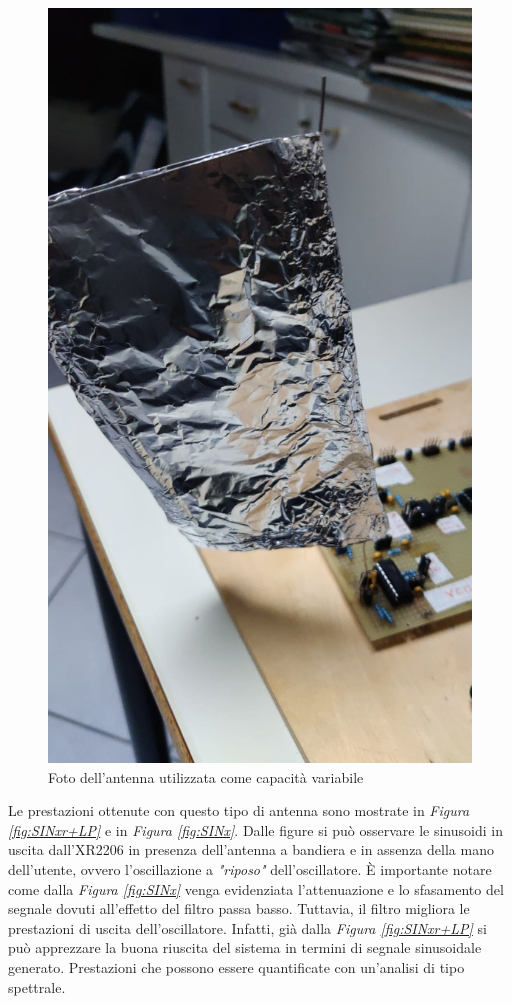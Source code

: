 \documentclass[titlepage]{report}
\begin{document}
	\begin{figure}[H]
		\centering
		\includegraphics[scale=0.25]{Immagini/Antenna.jpg}
		\caption{Foto dell'antenna utilizzata come capacità variabile}
		\label{fig:antenna}
	\end{figure}
	
	Le prestazioni ottenute con questo tipo di antenna sono mostrate in \textit{Figura \ref{fig:SINxr+LP}} e in \textit{Figura \ref{fig:SINx}}. Dalle figure si può osservare le sinusoidi in uscita dall'XR2206 in presenza dell'antenna a bandiera e in assenza della mano dell'utente, ovvero l'oscillazione a \textit{"riposo"} dell'oscillatore. È importante notare come dalla \textit{Figura \ref{fig:SINx}} venga evidenziata l'attenuazione e lo sfasamento del segnale dovuti all'effetto del filtro passa basso. Tuttavia, il filtro migliora le prestazioni di uscita dell'oscillatore. Infatti, già dalla \textit{Figura \ref{fig:SINxr+LP}} si può apprezzare la buona riuscita del sistema in termini di segnale sinusoidale generato. Prestazioni che possono essere quantificate con un'analisi di tipo spettrale.
\end{document}
